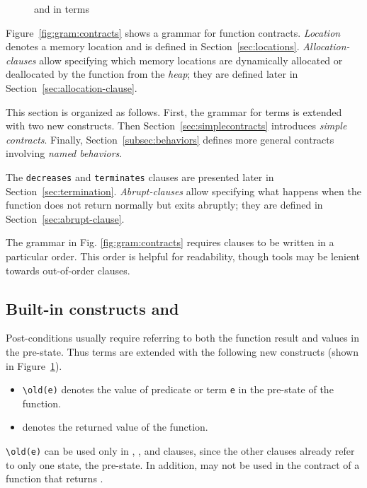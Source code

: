 \begin{figure}[t]
  \begin{cadre}
      
    \end{cadre}
    \caption{\protect\old and \protect\result in terms}
  \label{fig:gram:oldandresult}
\end{figure}

Figure~\ref{fig:gram:contracts} shows a grammar for function
contracts. \textsl{Location} denotes a memory location and is defined
in Section~\ref{sec:locations}. 
\textsl{Allocation-clauses} allow specifying which memory locations 
are dynamically allocated or deallocated by the function from the \textsl{heap}; 
they are defined later in Section~\ref{sec:allocation-clause}.

This section is organized as follows.  First, the grammar for terms is
extended with two new constructs.  Then
Section~\ref{sec:simplecontracts} introduces \emph{simple contracts}.
Finally, Section~\ref{subsec:behaviors} defines more general contracts
involving \emph{named behaviors}. 

The \lstinline|decreases| and
\lstinline|terminates| clauses are presented later in
Section~\ref{sec:termination}.
\textsl{Abrupt-clauses}
allow specifying what happens when the function does not return
normally but exits abruptly; they are defined in
Section~\ref{sec:abrupt-clause}.

The grammar in Fig. \ref{fig:gram:contracts} requires clauses to be written
in a particular order. This order is helpful for readability, though tools may 
be lenient towards out-of-order clauses.

\subsection{Built-in constructs %
  \texorpdfstring{\old}{\textbackslash{}old} %
 and \texorpdfstring{\result}{\textbackslash{}result}}

Post-conditions usually require referring to both the function result and
values in the pre-state. Thus terms are extended with the following new
constructs (shown in Figure~\ref{fig:gram:oldandresult}).
\begin{itemize}
\item \lstinline|\old(e)| denotes the value of
  predicate or term \lstinline|e| in the pre-state of the function.
\item \result{} denotes the returned value of the function.
\end{itemize}
\lstinline|\old(e)| can be used only in \ensures{}, \assigns{},
\allocates{} and \frees{} clauses, since
the other clauses already refer to only one state, the pre-state.
In addition, \result{} may not be used in the contract of a function that returns
\void{}.

